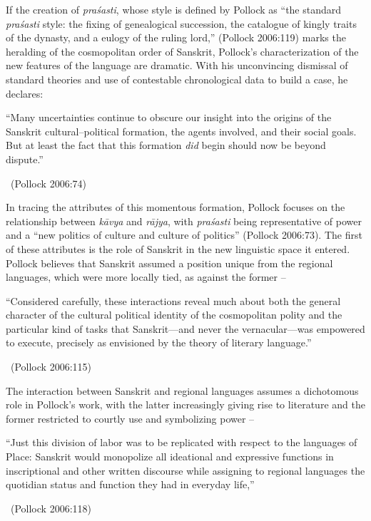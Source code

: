 If the creation of \textit{praśasti}, whose style is defined by Pollock as “the standard \textit{praśasti} style: the fixing of genealogical succession, the catalogue of kingly traits of the dynasty, and a eulogy of the ruling lord,” (Pollock 2006:119) marks the heralding of the cosmopolitan order of Sanskrit, Pollock’s characterization of the new features of the language are dramatic. With his unconvincing dismissal of standard theories and use of contestable chronological data to build a case, he declares:

\begin{myquote}
“Many uncertainties continue to obscure our insight into the origins of the Sanskrit cultural–political formation, the agents involved, and their social goals. But at least the fact that this formation \textit{did} begin should now be beyond dispute.” 

~\hfill (Pollock 2006:74)
\end{myquote}

In tracing the attributes of this momentous formation, Pollock focuses on the relationship between \textit{kāvya} and \textit{rājya}, with \textit{praśasti} being representative of power and a “new politics of culture and culture of politics” (Pollock 2006:73). The first of these attributes is the role of Sanskrit in the new linguistic space it entered. Pollock believes that Sanskrit assumed a position unique from the regional languages, which were more locally tied, as against the former –

\begin{myquote}
“Considered carefully, these interactions reveal much about both the general character of the cultural political identity of the cosmopolitan polity and the particular kind of tasks that Sanskrit—and never the vernacular—was empowered to execute, precisely as envisioned by the theory of literary language.” 

~\hfill (Pollock 2006:115)
\end{myquote}

The interaction between Sanskrit and regional languages assumes a dichotomous role in Pollock’s work, with the latter increasingly giving rise to literature and the former restricted to courtly use and symbolizing power –

\begin{myquote}
“Just this division of labor was to be replicated with respect to the languages of Place: Sanskrit would monopolize all ideational and expressive functions in inscriptional and other written discourse while assigning to regional languages the quotidian status and function they had in everyday life,” 

~\hfill (Pollock 2006:118)
\end{myquote}


